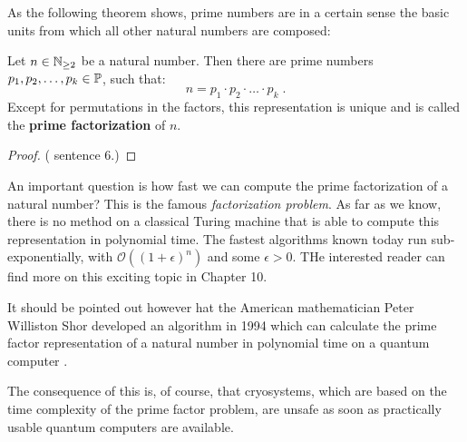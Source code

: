 As the following theorem shows, prime numbers are in a certain sense the basic units from which all other natural numbers are composed:
\begin{theorem}
\label{theorem: primfactor_decomposition}
Let $ n \in \mathbb{N}_{\geq 2} $ be a natural number. Then there are prime numbers 
$ p_1, p_2, \ldots, p_k \in \mathbb{P} $, such that:
\begin{equation}
n = p_1 \cdot p_2 \cdot \ldots \cdot p_k \;.
\end{equation}
Except for permutations in the factors, this representation is unique and is called the \textbf{prime factorization} of $ n $.
\end{theorem}
\begin{proof} (\cite{AL} sentence 6.) 
\end{proof}
\begin{remark}
An important question is how fast we can compute the prime factorization of a natural number? This is the famous \textit{factorization problem}. As far as we know, there is no method on a classical Turing machine that is able to compute this representation in polynomial time. The fastest algorithms known today run sub-exponentially, with $\mathcal{O}((1+ \epsilon)^n)$ and some $ \epsilon> 0 $. THe interested reader can find more on this exciting topic in \cite{JB} Chapter 10.
\end{remark}
\begin{remark}
It should be pointed out however hat the American mathematician Peter Williston Shor developed an algorithm in 1994 which can calculate the prime factor representation of a natural number in polynomial time on a quantum computer \cite{PS}.

The consequence of this is, of course, that cryosystems, which are based on the time complexity of the prime factor problem, are unsafe as soon as practically usable quantum computers are available.
\end{remark} 


